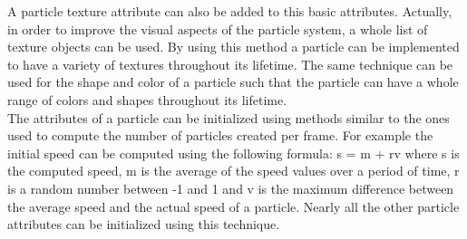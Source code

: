 A particle texture attribute can also be added to this basic attributes. Actually, in order to improve the visual aspects of the particle system, a whole list of texture objects can be used. By using this method a particle can be implemented to have a variety of textures throughout its lifetime. The same technique can be used for the shape and color of a particle such that the particle can have a whole range of colors and shapes throughout its lifetime.\\

The attributes of a particle can be initialized using methods similar to the ones used to compute the number of particles created per frame. For example the initial speed can be computed using the following formula: s = m + rv where s is the computed speed, m is the average of the speed values over a period of time, r is a random number between -1 and 1 and v is the maximum difference between the average speed and the actual speed of a particle. Nearly all the other particle attributes can be initialized using this technique.\\

